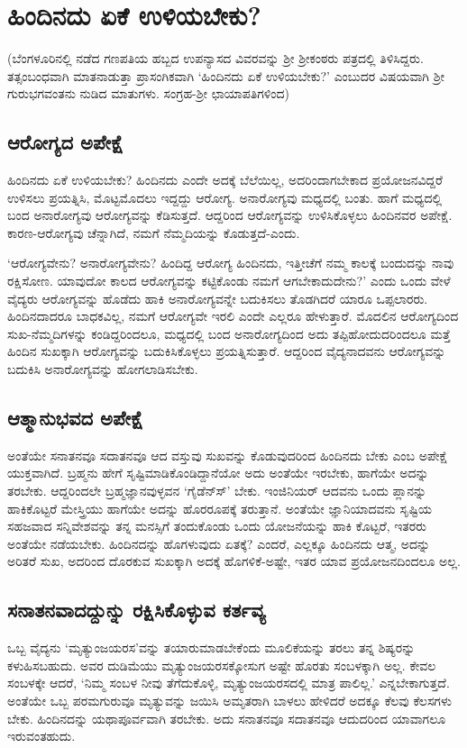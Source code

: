 \chapter{ಹಿಂದಿನದು ಏಕೆ ಉಳಿಯಬೇಕು?} 

(ಬೆಂಗಳೂರಿನಲ್ಲಿ ನಡೆದ ಗಣಪತಿಯ ಹಬ್ಬದ ಉಪನ್ಯಾಸದ ವಿವರವನ್ನು ಶ್ರೀ ಶ್ರೀಕಂಠರು ಪತ್ರದಲ್ಲಿ ತಿಳಿಸಿದ್ದರು. ತತ್ಸಂಬಂಧವಾಗಿ ಮಾತನಾಡುತ್ತಾ ಪ್ರಾಸಂಗಿಕವಾಗಿ `ಹಿಂದಿನದು ಏಕೆ ಉಳಿಯಬೇಕು?' ಎಂಬುದರ ವಿಷಯವಾಗಿ ಶ್ರೀ ಗುರುಭಗವಂತನು ನುಡಿದ ಮಾತುಗಳು. ಸಂಗ್ರಹ-ಶ್ರೀ ಛಾಯಾಪತಿಗಳಿಂದ) 

\section*{ಆರೋಗ್ಯದ ಅಪೇಕ್ಷೆ}

ಹಿಂದಿನದು ಏಕೆ ಉಳಿಯಬೇಕು? ಹಿಂದಿನದು ಎಂದೇ ಅದಕ್ಕೆ ಬೆಲೆಯಿಲ್ಲ, ಅದರಿಂದಾಗಬೇಕಾದ ಪ್ರಯೋಜನವಿದ್ದರೆ ಉಳಿಸಲು ಪ್ರಯತ್ನಿಸಿ, ಮೊಟ್ಟಮೊದಲು ಇದ್ದದ್ದು ಆರೋಗ್ಯ. ಅನಾರೋಗ್ಯವು ಮಧ್ಯದಲ್ಲಿ ಬಂತು. ಹಾಗೆ ಮಧ್ಯದಲ್ಲಿ ಬಂದ ಅನಾರೋಗ್ಯವು ಆರೋಗ್ಯವನ್ನು ಕೆಡಿಸುತ್ತದೆ. ಆದ್ದರಿಂದ ಆರೋಗ್ಯವನ್ನು ಉಳಿಸಿಕೊಳ್ಳಲು ಹಿಂದಿನವರ ಅಪೇಕ್ಷೆ. ಕಾರಣ-ಆರೋಗ್ಯವು ಚೆನ್ನಾಗಿದೆ, ನಮಗೆ ನೆಮ್ಮದಿಯನ್ನು ಕೊಡುತ್ತದೆ-ಎಂದು. 

`ಆರೋಗ್ಯವೇನು? ಅನಾರೋಗ್ಯವೇನು? ಹಿಂದಿದ್ದ ಆರೋಗ್ಯ ಹಿಂದಿನದು, ಇತ್ತೀಚೆಗೆ ನಮ್ಮ ಕಾಲಕ್ಕೆ ಬಂದುದನ್ನು ನಾವು ರಕ್ಷಿಸೋಣ. ಯಾವುದೋ ಕಾಲದ ಆರೋಗ್ಯವನ್ನು ಕಟ್ಟಿಕೊಂಡು ನಮಗೆ ಆಗಬೇಕಾದುದೇನು?' ಎಂದು ಒಂದು ವೇಳೆ ವೈದ್ಯರು ಆರೋಗ್ಯವನ್ನು ಹೊಡೆದು ಹಾಕಿ ಅನಾರೋಗ್ಯವನ್ನೇ ಬದುಕಿಸಲು ತೊಡಗಿದರೆ ಯಾರೂ ಒಪ್ಪಲಾರರು. ಹಿಂದಿನದಾದರೂ ಬಾಧಕವಿಲ್ಲ, ನಮಗೆ ಆರೋಗ್ಯವೇ ಇರಲಿ ಎಂದೇ ಎಲ್ಲರೂ ಹೇಳುತ್ತಾರೆ. ಮೊದಲಿನ ಆರೋಗ್ಯದಿಂದ ಸುಖ-ನೆಮ್ಮದಿಗಳನ್ನು ಕಂಡಿದ್ದರಿಂದಲೂ, ಮಧ್ಯದಲ್ಲಿ ಬಂದ ಅನಾರೋಗ್ಯದಿಂದ ಅದು ತಪ್ಪಿಹೋದುದರಿಂದಲೂ ಮತ್ತೆ ಹಿಂದಿನ ಸುಖಕ್ಕಾಗಿ ಆರೋಗ್ಯವನ್ನು ಬದುಕಿಸಿಕೊಳ್ಳಲು ಪ್ರಯತ್ನಿಸುತ್ತಾರೆ. ಆದ್ದರಿಂದ ವೈದ್ಯನಾದವನು ಆರೋಗ್ಯವನ್ನು ಬದುಕಿಸಿ ಅನಾರೋಗ್ಯವನ್ನು ಹೋಗಲಾಡಿಸಬೇಕು. 

\section*{ಆತ್ಮಾನುಭವದ ಅಪೇಕ್ಷೆ}

ಅಂತೆಯೇ ಸನಾತನವೂ ಸದಾತನವೂ ಆದ ವಸ್ತುವು ಸುಖವನ್ನು ಕೊಡುವುದರಿಂದ ಹಿಂದಿನದು ಬೇಕು ಎಂಬ ಅಪೇಕ್ಷೆ ಯುಕ್ತವಾಗಿದೆ. ಬ್ರಹ್ಮನು ಹೇಗೆ ಸೃಷ್ಟಿಮಾಡಿಕೊಂಡಿದ್ದಾನೆಯೋ ಅದು ಅಂತೆಯೇ ಇರಬೇಕು, ಹಾಗೆಯೇ ಅದನ್ನು ತರಬೇಕು. ಆದ್ದರಿಂದಲೇ ಬ್ರಹ್ಮಜ್ಞಾನವುಳ್ಳವನ `ಗೈಡೆನ್ಸ್‍' ಬೇಕು. ಇಂಜಿನಿಯರ್‍ ಆದವನು ಒಂದು ಪ್ಲಾನನ್ನು ಹಾಕಿಕೊಟ್ಟರೆ ಮೇಸ್ತ್ರಿಯು ಹಾಗೆಯೇ ಅದನ್ನು ಹೊರರೂಪಕ್ಕೆ ತರುತ್ತಾನೆ. ಅಂತೆಯೇ ಜ್ಞಾನಿಯಾದವನು ಸೃಷ್ಟಿಯ ಸಹಜವಾದ ಸನ್ನಿವೇಶವನ್ನು ತನ್ನ ಮನಸ್ಸಿಗೆ ತಂದುಕೊಂಡು ಒಂದು ಯೋಜನೆಯನ್ನು ಹಾಕಿ ಕೊಟ್ಟರೆ, ಇತರರು ಅಂತೆಯೇ ನಡೆಯಬೇಕು. ಹಿಂದಿನದನ್ನು ಹೊಗಳುವುದು ಏತಕ್ಕೆ? ಎಂದರೆ, ಎಲ್ಲಕ್ಕೂ ಹಿಂದಿನದು ಆತ್ಮ, ಅದನ್ನು ಅರಿತರೆ ಸುಖ, ಅದರಿಂದ ದೊರಕುವ ಸುಖಕ್ಕಾಗಿ ಅದಕ್ಕೆ ಹೊಗಳಿಕೆ-ಅಷ್ಟೇ, ಇತರ ಯಾವ ಪ್ರಯೋಜನದಿಂದಲೂ ಅಲ್ಲ. 

\section*{ಸನಾತನವಾದದ್ದುನ್ನು ರಕ್ಷಿಸಿಕೊಳ್ಳುವ ಕರ್ತವ್ಯ}

ಒಬ್ಬ ವೈದ್ಯನು `ಮೃತ್ಯುಂಜಯರಸ'ವನ್ನು ತಯಾರುಮಾಡಬೇಕೆಂದು ಮೂಲಿಕೆಯನ್ನು ತರಲು ತನ್ನ ಶಿಷ್ಯರನ್ನು ಕಳುಹಿಸಬಹುದು. ಅವರ ದುಡಿಮೆಯು ಮೃತ್ಯುಂಜಯರಸಕ್ಕೋಸುಗ ಅಷ್ಟೇ ಹೊರತು ಸಂಬಳಕ್ಕಾಗಿ ಅಲ್ಲ. ಕೇವಲ ಸಂಬಳಕ್ಕೇ ಆದರೆ, `ನಿಮ್ಮ ಸಂಬಳ ನೀವು ತೆಗೆದುಕೊಳ್ಳಿ, ಮೃತ್ಯುಂಜಯರಸದಲ್ಲಿ ಮಾತ್ರ ಪಾಲಿಲ್ಲ.' ಎನ್ನಬೇಕಾಗುತ್ತದೆ. ಅಂತೆಯೇ ಒಬ್ಬ ಪರಮಗುರುವೂ ಮೃತ್ಯುವನ್ನು ಜಯಿಸಿ ಅಮೃತರಾಗಿ ಬಾಳಲು ಹೇಳಿದರೆ ಅದಕ್ಕೂ ಕೆಲವು ಕೆಲಸಗಳು ಬೇಕು. ಹಿಂದಿನದನ್ನು ಯಥಾಪೂರ್ವವಾಗಿ ತರಬೇಕು. ಅದು ಸನಾತನವೂ ಸದಾತನವೂ ಆದುದರಿಂದ ಯಾವಾಗಲೂ ಇರುವಂತಹುದು. 
